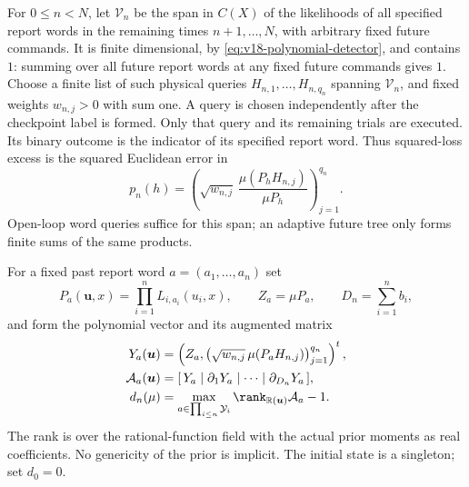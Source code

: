 \documentclass[11pt]{amsart}
\theoremstyle{definition}\newtheorem{definition}[theorem]{Definition}
\theoremstyle{remark}\newtheorem{remark}[theorem]{Remark}
\newcommand{\R}{\mathbb R}\newcommand{\N}{\mathbb N}\newcommand{\C}{\mathbb C}
\begin{document}
For $0\le n<N$, let $\mathscr V_n$ be the span in $C(X)$ of the
likelihoods of all specified report words in the remaining times
$n+1,\ldots,N$, with arbitrary fixed future commands. It is finite
dimensional, by \eqref{eq:v18-polynomial-detector}, and contains $1$:
summing over all future report words at any fixed future commands gives
$1$. Choose a finite list of such physical queries
$H_{n,1},\ldots,H_{n,q_n}$ spanning $\mathscr V_n$, and fixed weights
$w_{n,j}>0$ with sum one. A query is chosen independently after the
checkpoint label is formed. Only that query and its remaining trials
are executed. Its binary outcome is the indicator of its specified
report word. Thus squared-loss excess is the squared Euclidean error in
\[
 p_n(h)=\left(\sqrt{w_{n,j}}\,
             \frac{\mu(P_hH_{n,j})}{\mu P_h}\right)_{j=1}^{q_n}.
\]
Open-loop word queries suffice for this span; an adaptive future tree
only forms finite sums of the same products.

For a fixed past report word $a=(a_1,\ldots,a_n)$ set
\[
 P_a(\boldsymbol u,x)=\prod_{i=1}^nL_{i,a_i}(u_i,x),\qquad
 Z_a=\mu P_a,\qquad D_n=\sum_{i=1}^nb_i,
\]
and form the polynomial vector and its augmented matrix
\begin{equation}\label{eq:v18-augmented-matrix}
 \begin{split}
 Y_a(\boldsymbol u)&=
 \left(Z_a,\bigl(\sqrt{w_{n,j}}\,\mu(P_aH_{n,j})\bigr)_{j=1}^{q_n}\right)^t,\\
 \mathcal A_a(\boldsymbol u)&=
 [\,Y_a\mid\partial_1Y_a\mid\cdots\mid\partial_{D_n}Y_a\,],\\
 d_n(\mu)&=\max_{a\in\prod_{i\le n}\mathcal Y_i}
       \rank_{\R(\boldsymbol u)}\mathcal A_a-1.
 \end{split}
\end{equation}
The rank is over the rational-function field with the actual prior
moments as real coefficients. No genericity of the prior is implicit.
The initial state is a singleton; set $d_0=0$.
\end{document}
